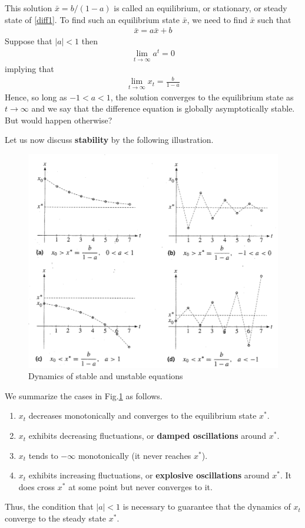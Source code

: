 \documentclass[11pt,a4paper]{book}
\theoremstyle{definition}\newtheorem{definition}{Definition}
\theoremstyle{definition}\newtheorem{fact}{Fact}
\theoremstyle{definition}\newtheorem{remark}{Remark}
\theoremstyle{definition}\newtheorem{ex}{Ex.}
\theoremstyle{definition}\newtheorem{project}{Project}
\theoremstyle{definition}\newtheorem{problem}{Problem}
\theoremstyle{definition}\newtheorem{example}{Example}
\numberwithin{theorem}{section}
\numberwithin{corollary}{chapter}
\numberwithin{assumption}{chapter}
\numberwithin{definition}{chapter}
\numberwithin{prop}{chapter}
\numberwithin{notation}{chapter}
\numberwithin{problem}{chapter}
\numberwithin{example}{chapter}
\numberwithin{fact}{chapter}
\numberwithin{ex}{chapter}
\begin{document}
	This solution $\bar{x} = b/(1-a)$ is called an equilibrium, or stationary, or steady state of \eqref{diff1}. To find such an equilibrium state $\bar{x}$, we need to find $\bar{x}$ such that
	\begin{align*}
		\bar{x} = a \bar{x} + b
	\end{align*}
	Suppose that $|a| < 1$ then 
	\begin{align*}
		\lim_{t\to \infty} a^t = 0
	\end{align*}
	implying that
	\begin{align*}
		\lim_{t \to \infty} x_t = \frac{b}{1-a}
	\end{align*}
	Hence, so long as $-1 < a < 1$, the solution converges to the equilibrium state as $t\to \infty$ and we say that the difference equation is globally asymptotically stable. But would happen otherwise?
	
	Let us now discuss \textbf{stability} by the following illustration.
	\begin{figure}[H]
		\centering
		\includegraphics[scale=0.4]{figs/page393.png}
		\caption{Dynamics of stable and unstable equations \citep[p.393]{sydsaeter2008further} } 
		\label{fig:stablity}
	\end{figure}
	
	We summarize the cases in Fig.\ref{fig:stablity} as follows.
	\begin{enumerate}[label=(\alph*)]
		\item $x_t$ decreases monotonically and converges to the equilibrium state $x^*$.
		\item $x_t$ exhibits decreasing fluctuations, or \textbf{damped oscillations} around $x^*$.
		\item $x_t$ tends to $-\infty$ monotonically (it never reaches $x^*$).
		\item $x_t$ exhibits increasing fluctuations, or \textbf{explosive oscillations} around $x^*$. It does cross $x^*$ at some point but never converges to it.
	\end{enumerate}
	Thus, the condition that $|a| < 1$ is necessary to guarantee that the dynamics of $x_t$ converge to the steady state $x^*$.
	
\end{document}

